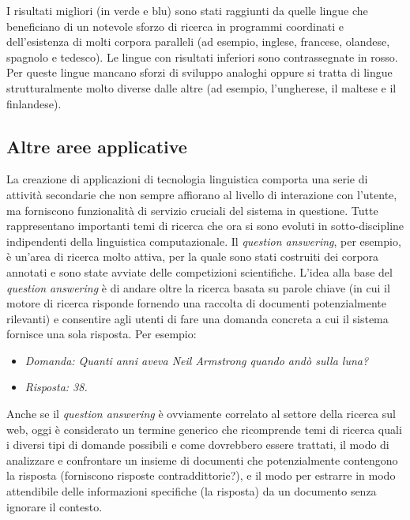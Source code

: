 \begin{multicols}{2}
I risultati migliori (in verde e blu) sono stati raggiunti da quelle lingue che beneficiano di un notevole sforzo di ricerca in programmi coordinati e dell'esistenza di molti corpora paralleli (ad esempio, inglese, francese, olandese, spagnolo e tedesco). Le lingue con risultati inferiori sono contrassegnate in rosso. Per queste  lingue mancano sforzi di sviluppo analoghi oppure si tratta di lingue strutturalmente molto diverse dalle altre (ad esempio, l'ungherese, il maltese e il finlandese).



\subsection{Altre aree applicative}

La creazione di applicazioni di tecnologia linguistica comporta una serie di
attivit\`{a} secondarie che non sempre affiorano al livello di interazione con
l'utente, ma forniscono funzionalit\`{a} di servizio cruciali del
sistema in questione. Tutte rappresentano importanti temi di ricerca che
ora si sono evoluti in sotto-discipline indipendenti della linguistica
computazionale. Il \emph{question answering}, per esempio, \`{e} un'area di ricerca molto attiva, per la quale sono stati costruiti dei corpora annotati e sono state avviate delle competizioni scientifiche. L'idea alla base del \emph{question answering} \`{e} di andare oltre la ricerca basata su parole chiave (in cui il motore di ricerca risponde fornendo una raccolta di documenti potenzialmente rilevanti) e consentire agli utenti di fare una domanda concreta a cui il sistema fornisce una sola risposta. Per esempio:

\begin{itemize}
\item[] \textit{Domanda: Quanti anni aveva Neil Armstrong quando and\`{o} sulla luna?}
\item[] \textit{Risposta: 38.}
\end{itemize}

Anche se il \emph{question answering} \`{e} ovviamente correlato al settore della ricerca sul web, oggi \`{e} considerato un termine generico che ricomprende temi di ricerca quali i diversi tipi di domande possibili e come dovrebbero essere trattati, il modo di analizzare e confrontare un insieme di documenti che potenzialmente contengono la risposta (forniscono risposte contraddittorie?), e il modo per estrarre in modo attendibile delle informazioni specifiche (la risposta) da un documento senza ignorare il contesto.


\end{multicols}
